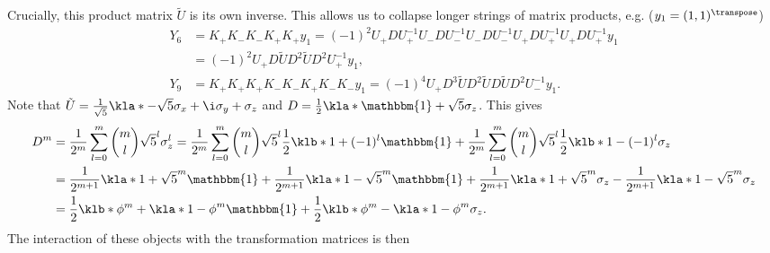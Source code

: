 \documentclass[english, parskip=full]{scrartcl}
\begin{document}
Crucially, this product matrix $\tilde{U}$ is its own inverse.
This allows us to collapse longer strings of matrix products, e.g. ($y_1=(1,1)^\transpose$)
\begin{align}
Y_6 &= K_+ K_-K_-K_+K_+ y_1 = (-1)^{2} U_+DU_+^{-1} U_-DU_-^{-1} U_-DU_-^{-1} U_+DU_+^{-1} U_+DU_+^{-1} y_1\\
&= (-1)^2 U_+ D\tilde{U}D^2 \tilde{U}D^2 U_+^{-1} y_1,\\
Y_9 &= K_+K_+K_+K_-K_-K_+K_-K_- y_1 = (-1)^4 U_+ D^3 \tilde{U} D^2 \tilde{U} D \tilde{U} D^2 U_-^{-1} y_1.
\end{align}
Note that $\tilde{U} = \frac{1}{\sqrt{5}} \kla*{-\sqrt{5} \sigma_x + \i \sigma_y + \sigma_z}$ and $D = \frac{1}{2}\kla*{\mathbbm{1} + \sqrt{5} \sigma_z}$.
This gives
\begin{align}
D^m &= \frac{1}{2^m}\sum_{l=0}^m \binom{m}{l} \sqrt{5}^l \sigma_z^l = \frac{1}{2^m}\sum_{l=0}^m \binom{m}{l} \sqrt{5}^l \frac{1}{2}\klb*{1 + (-1)^l}\mathbbm{1} + \frac{1}{2^m}\sum_{l=0}^m \binom{m}{l} \sqrt{5}^l \frac{1}{2}\klb*{1 - (-1)^l} \sigma_z\\
&= \frac{1}{2^{m+1}} \kla*{1+ \sqrt{5}}^m\mathbbm{1} + \frac{1}{2^{m+1}} \kla*{1 - \sqrt{5}}^m\mathbbm{1} + \frac{1}{2^{m+1}} \kla*{1+ \sqrt{5}}^m \sigma_z - \frac{1}{2^{m+1}} \kla*{1 - \sqrt{5}}^m \sigma_z\\
&= \frac{1}{2} \klb*{\phi^m + \kla*{1-\phi}^m} \mathbbm{1} + \frac{1}{2} \klb*{\phi^m - \kla*{1-\phi}^m}\sigma_z.
\end{align}
The interaction of these objects with the transformation matrices is then
\end{document}
